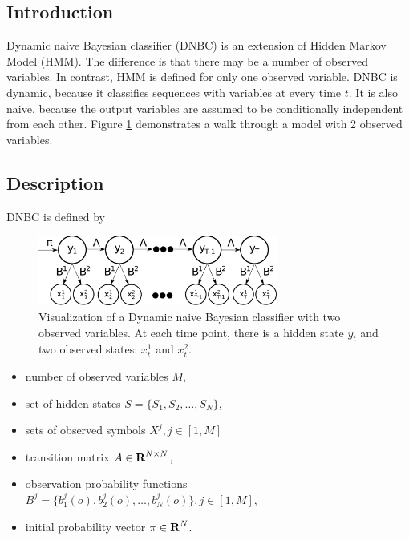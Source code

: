 \documentclass[thesis=B,english]{FITthesis}[2012/06/26]
\begin{document}
\subsection{Introduction}

Dynamic naive Bayesian classifier (DNBC) is an extension of Hidden Markov Model (HMM). The difference is that there may be a number of observed variables. In contrast, HMM is defined for only one observed variable. DNBC is dynamic, because it classifies sequences with variables at every time $t$. It is also naive, because the output variables are assumed to be conditionally independent from each other. Figure \ref{fig:dnbc} demonstrates a walk through a model with 2 observed variables. 

\subsection{Description}

DNBC is defined by

\begin{figure}
	\centering
 	\includegraphics[width=0.7\textwidth]{dnbc}
 	\caption{Visualization of a Dynamic naive Bayesian classifier with two observed variables. At each time point, there is a hidden state $y_t$ and two observed states: $x_t^1$ and $x_t^2$.}
 	\label{fig:dnbc}
\end{figure}

\begin{itemize}

\item{number of observed variables $M$,}
\item set of hidden states $S = \{S_1, S_2, \dots, S_N\}$,
\item{sets of observed symbols $X^j, j \in [1,M]$}
\item transition matrix $A \in \textbf R^{N \times N}$,
\item observation probability functions $B^j = \{b_1^j(o), b_2^j(o), \dots, b_N^j(o)\}, j \in [1,M]$,
\item initial probability vector $\pi \in \textbf R^N$.

\end{itemize}
\end{document}
